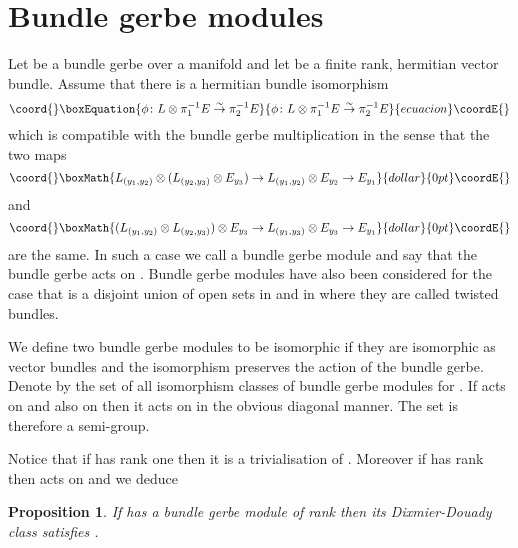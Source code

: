 \documentclass[a4paper,reqno]{amsart}
\DeclareMathOperator{\Mod}{Mod}
\theoremstyle{plain}
\newtheorem{proposition}[theorem]{Proposition}
\theoremstyle{definition}
\theoremstyle{remark}
\numberwithin{equation}{section}
\numberwithin{figure}{section}
\providecommand{\<}{\langle}
\renewcommand{\>}{\rangle}
\begin{document}
\section{Bundle gerbe modules}

Let \coordHE{} be a bundle gerbe over a manifold \coordHE{} and let \coordHE{}
be a finite rank, hermitian vector bundle. Assume that there is a
hermitian bundle
isomorphism
\begin{equation}\coord{}\boxEquation{
\label{eq:bgmod}
\phi \colon L\otimes \pi_1^{-1}E \stackrel{\sim}{\to}
\pi_2^{-1}E
}{
\phi \colon L\otimes \pi_1^{-1}E \stackrel{\sim}{\to}
\pi_2^{-1}E
}{ecuacion}\coordE{}\end{equation}
which is compatible with the bundle gerbe multiplication in the sense
that the two maps
$$\coord{}\boxMath{
L_{(y_1, y_2)} \otimes (L_{(y_2, y_3)} \otimes E_{y_3} ) \to
L_{(y_1, y_2)} \otimes E_{y_2} \to E_{y_1}
}{dollar}{0pt}\coordE{}$$
and
$$\coord{}\boxMath{
(L_{(y_1, y_2)} \otimes L_{(y_2, y_3)} )\otimes E_{y_3} \to
L_{(y_1, y_3)} \otimes E_{y_3} \to E_{y_1}
}{dollar}{0pt}\coordE{}$$
are the same.  In such a case we call \coordHE{} a  bundle gerbe module and say
that the bundle gerbe acts on \coordHE{}.  Bundle gerbe modules have also
been considered for the case that \coordHE{} is a disjoint
union of open sets in \cite{LupUri} and in \cite{Mac} where they are called
twisted bundles.

We define two bundle gerbe modules to be isomorphic if they are
isomorphic as vector bundles and the isomorphism
preserves the action of the bundle gerbe.
Denote by \myHighlight{$\Mod(L)$}\coordHE{} the set of all isomorphism classes of
bundle gerbe modules for \coordHE{}.
If \coordHE{} acts on \coordHE{} and also on \coordHE{} then it acts on \coordHE{}
in the obvious diagonal manner.  The set  \myHighlight{$\Mod(L)$}\coordHE{} is therefore
a semi-group.

Notice that if \coordHE{} has rank one then it is a trivialisation
of \coordHE{}. Moreover if \coordHE{}  has  rank \coordHE{} then \coordHE{}
acts on \coordHE{} and we deduce
\begin{proposition}
\label{prop:torsion}
If \coordHE{} has a bundle gerbe module \coordHE{} of rank \coordHE{} then its
Dixmier-Douady class \coordHE{} satisfies \coordHE{}.
\end{proposition}
\end{document}
